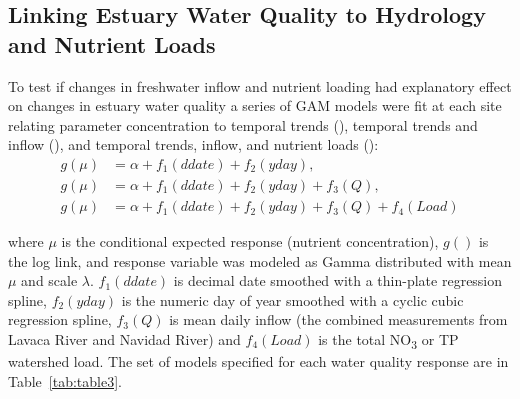 \documentclass[sn-basic,referee,lineno,pdflatex]{sn-jnl}
\begin{document}
\hypertarget{linking-estuary-water-quality-to-hydrology-and-nutrient-loads}{%
\subsection{Linking Estuary Water Quality to Hydrology and Nutrient
Loads}\label{linking-estuary-water-quality-to-hydrology-and-nutrient-loads}}

To test if changes in freshwater inflow and nutrient loading had
explanatory effect on changes in estuary water quality a series of GAM
models were fit at each site relating parameter concentration to
temporal trends (\citep{eq-eq5}), temporal trends and inflow
(\citet{eq-eq6}), and temporal trends, inflow, and nutrient loads
(\citet{eq-eq7}): \begin{align}
g(\mu) &= \alpha + f_1(ddate) + f_2(yday), \label{eq5} \\
g(\mu) &= \alpha + f_1(ddate) + f_2(yday) + f_3(Q), \label{eq6} \\
g(\mu) &= \alpha + f_1(ddate) + f_2(yday) + f_3(Q) + f_4(Load) \label{eq7}
\end{align}

where \(\mu\) is the conditional expected response (nutrient
concentration), \(g()\) is the log link, and response variable was
modeled as Gamma distributed with mean \(\mu\) and scale \(\lambda\).
\(f_1(ddate)\) is decimal date smoothed with a thin-plate regression
spline, \(f_2(yday)\) is the numeric day of year smoothed with a cyclic
cubic regression spline, \(f_3(Q)\) is mean daily inflow (the combined
measurements from Lavaca River and Navidad River) and \(f_4(Load)\) is
the total NO\textsubscript{3} or TP watershed load. The set of models
specified for each water quality response are in Table~\ref{tab:table3}.
\end{document}
